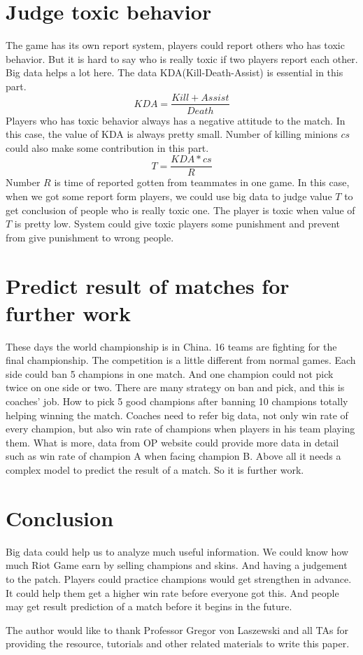 \documentclass[sigconf]{acmart}
\begin{document}
\section{Judge toxic behavior}
The game has its own report system, players could report others who has toxic behavior. But it is hard to say who is really toxic if two players report each other. Big data helps a lot here. The data KDA(Kill-Death-Assist) is essential in this part. \\
\begin{equation}
    KDA=\frac{Kill + Assist}{Death}
\end{equation}
Players who has toxic behavior always has a negative attitude to the match. In this case, the value of KDA is always pretty small. Number of killing minions $cs$ could also make some contribution in this part. \\
\begin{equation}
    T=\frac{KDA*cs}{R}
\end{equation}
Number $R$ is time of reported gotten from teammates in one game. In this case, when we got some report form players, we could use big data to judge value $T$ to get conclusion of people who is really toxic one. The player is toxic when value of $T$ is pretty low. System could give toxic players some punishment and prevent from give punishment to wrong people. 
\section{Predict result of matches for further work}
These days the world championship is in China. 16 teams are fighting for the final championship. The competition is a little different from normal games. Each side could ban 5 champions in one match. And one champion could not pick twice on one side or two. There are many strategy on ban and pick, and this is coaches' job. How to pick 5 good champions after banning 10 champions totally helping winning the match. Coaches need to refer big data, not only win rate of every champion, but also win rate of champions when players in his team playing them. What is more, data from OP website could provide more data in detail such as win rate of champion A when facing champion B. Above all it needs a complex model to predict the result of a match. So it is further work. 
\section{Conclusion}
Big data could help us to analyze much useful information. We could know how much Riot Game earn by selling champions and skins. And having a judgement to the patch. Players could practice champions would get strengthen in advance. It could help them get a higher win rate before everyone got this. And people may get result prediction of a match before it begins in the future. 
\begin{acks}

The author would like to thank Professor Gregor von Laszewski and all TAs for providing the resource, tutorials and other related materials to write this paper.

\end{acks}



\end{document}
